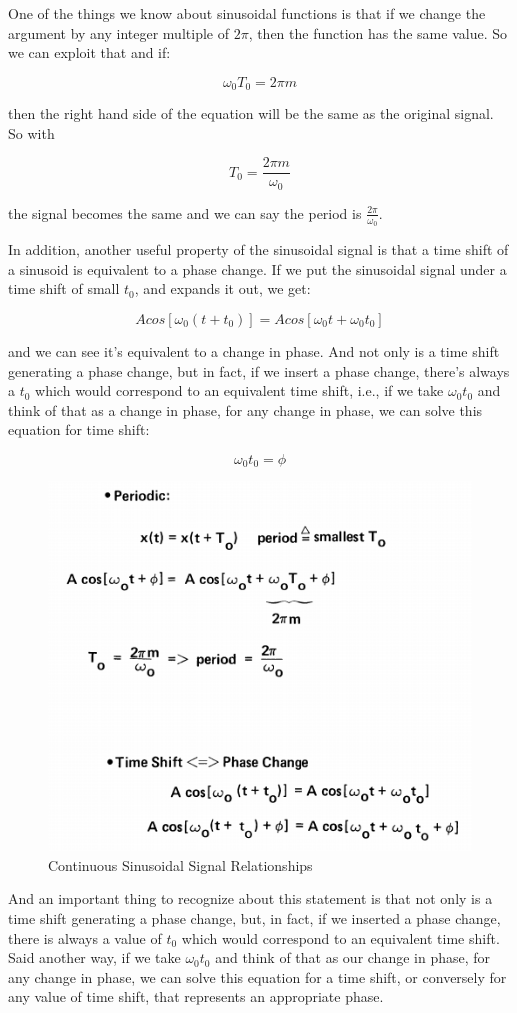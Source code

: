\documentclass[fleqn,10pt]{olplainarticle}
\theoremstyle{definition}
\theoremstyle{remark}
\begin{document}
One of the things we know about sinusoidal functions is that if we change the argument by any integer multiple of $2 \pi$, then the function has the same value. So we can exploit that and  if:

$$\omega_0 T_0 = 2 \pi m$$

then the right hand side of the equation will be the same as the original signal. So with

$$T_0 = \frac{2 \pi m}{\omega_0}$$ 

the signal becomes the same and we can say the period is $\frac{2 \pi}{\omega_0}$.

In addition, another useful property of the sinusoidal signal is that a time shift of a sinusoid is equivalent to a phase change. If we put the sinusoidal signal under a time shift of small $t_0$, and expands it out, we get:

$$A cos[\omega_0 (t+t_0)] = A cos[\omega_0 t + \omega_0 t_0]$$

and we can see it's equivalent to a change in phase. And not only is a time shift generating a phase change, but in fact, if we insert a phase change, there's always a $t_0$ which would correspond to an equivalent time shift, i.e., if we take $\omega_0t_0$ and think of that as a change in phase, for any change in phase, we can solve this equation for time shift:

$$\omega_0 t_0 = \phi$$

\begin{figure}[ht]
\centering
\includegraphics[width=0.5\linewidth]{images/signals_02.png}
\caption{Continuous Sinusoidal Signal Relationships}
\label{fig:signals_02}
\end{figure}

And an important thing to recognize about this statement is that not only is a time shift generating a phase change, but, in fact, if we inserted a phase change, there is always a value of $t_0$ which would correspond to an equivalent time shift. Said another way, if we take $\omega_0 t_0$ and think of that as our change in phase, for any change in phase, we can solve this equation for a time shift, or conversely for any value of time shift, that represents an appropriate phase.
\end{document}
